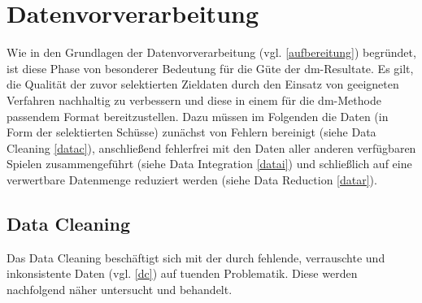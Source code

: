 \section{Datenvorverarbeitung}
\label{dv}
Wie in den Grundlagen der Datenvorverarbeitung (vgl. \vref{aufbereitung}) begründet, ist diese Phase von besonderer Bedeutung für die Güte der \gls{dm}-Resultate. Es gilt, die Qualität der zuvor selektierten Zieldaten durch den Einsatz von geeigneten Verfahren nachhaltig zu verbessern und diese in einem für die \gls{dm}-Methode passendem Format bereitzustellen. Dazu müssen im Folgenden die Daten (in Form der selektierten Schüsse) zunächst von Fehlern bereinigt (siehe Data Cleaning \vref{datac}), anschließend fehlerfrei mit den Daten aller anderen verfügbaren Spielen zusammengeführt (siehe Data Integration \vref{datai}) und schließlich auf eine verwertbare Datenmenge reduziert werden (siehe Data Reduction \vref{datar}).

\subsection{Data Cleaning}
\label{datac}
Das Data Cleaning beschäftigt sich mit der durch fehlende, verrauschte und inkonsistente Daten (vgl. \vref{dc}) auf tuenden Problematik. Diese werden nachfolgend näher untersucht und behandelt. 


